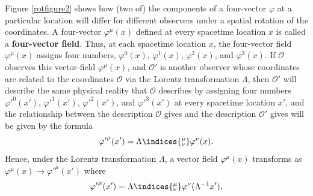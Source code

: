 \documentclass[12pt]{report}
\begin{document}
	Figure \ref{rotfigure2} shows how (two of) the components of a four-vector $\varphi$ at a particular location will differ for different observers under a spatial rotation of the coordinates. A four-vector $\varphi^\mu(x)$ defined at every spacetime location $x$ is called a \textbf{four-vector field}. Thus,  at each spacetime location $x$, the four-vector field $\varphi^\mu(x)$ assigns four numbers, $\varphi^0(x)$, $\varphi^1(x)$, $\varphi^2(x)$, and $\varphi^3(x)$. If $\mathcal{O}$ observes this vector-field $\varphi^\mu(x)$, and $\mathcal{O}'$ is another observer whose coordinates are related to the coordinates $\mathcal{O}$ via the Lorentz transformation $\Lambda$, then $\mathcal{O}'$ will describe the same physical reality that $\mathcal{O}$ describes by assigning four numbers ${\varphi'}^0(x')$, ${\varphi'}^1(x')$, ${\varphi'}^2(x')$, and ${\varphi'}^3(x')$ at every spacetime location $x'$, and the relationship between the description $\mathcal{O}$ gives and the  description $\mathcal{O}'$ gives will be given by the formula
	$${\varphi'}^\mu(x')=\Lambda\indices{^\mu_\nu}\varphi^\nu(x).$$
	Hence, under the Lorentz transformation $\Lambda$,  a vector field $\varphi^\mu(x)$ transforms as ${\varphi}^\mu(x)\rightarrow {\varphi'}^\mu(x')$ where
	\begin{equation}\label{lorentzvector}
	{\varphi'}^\mu(x')=\Lambda\indices{^\mu_\nu}\varphi^\nu(\Lambda^{-1}x').
	\end{equation} 
\end{document}
